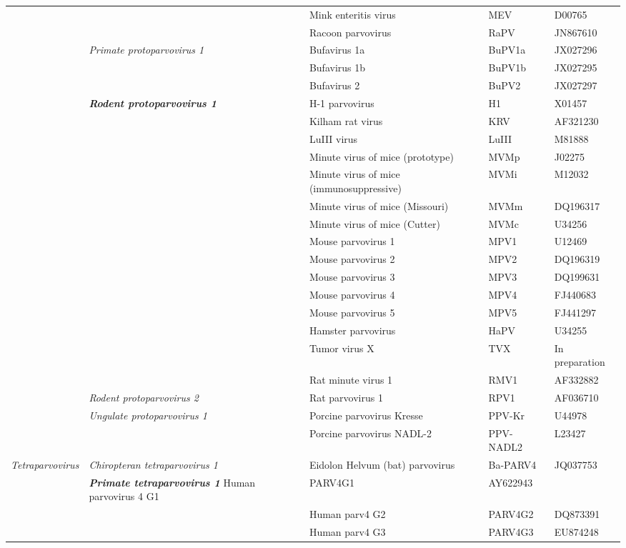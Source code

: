 \begin{longtable}{@{\extracolsep{\fill}}l l l l l}
 & & Mink enteritis virus & MEV & D00765 \\
 & & Racoon parvovirus & RaPV & JN867610 \\
 & \textit{Primate protoparvovirus 1} & Bufavirus 1a & BuPV1a & JX027296 \\
 & & Bufavirus 1b & BuPV1b & JX027295 \\
 & & Bufavirus 2 & BuPV2 & JX027297 \\
 & \textit{\textbf{Rodent protoparvovirus 1}} & H-1 parvovirus & H1 & X01457 \\
 & & Kilham rat virus & KRV & AF321230 \\
 & & LuIII virus & LuIII & M81888 \\
 & & Minute virus of mice (prototype) & MVMp & J02275 \\
 & & Minute virus of mice (immunosuppressive) & MVMi & M12032 \\
 & & Minute virus of mice (Missouri) & MVMm & DQ196317 \\
 & & Minute virus of mice (Cutter) & MVMc & U34256 \\
 & & Mouse parvovirus 1 & MPV1 & U12469 \\
 & & Mouse parvovirus 2 & MPV2 & DQ196319 \\
 & & Mouse parvovirus 3 & MPV3 & DQ199631 \\
 & & Mouse parvovirus 4 & MPV4 & FJ440683 \\
 & & Mouse parvovirus 5 & MPV5 & FJ441297 \\
 & & Hamster parvovirus & HaPV & U34255 \\ 
 & & Tumor virus X & TVX & In preparation \\
 & & Rat minute virus 1 & RMV1 & AF332882 \\
 & \textit{Rodent protoparvovirus 2} & Rat parvovirus 1 & RPV1 & AF036710 \\
 & \textit{Ungulate protoparvovirus 1} & Porcine parvovirus Kresse & PPV-Kr & U44978 \\
 & & Porcine parvovirus NADL-2 & PPV-NADL2 & L23427 \\
 \textit{Tetraparvovirus} & \textit{Chiropteran tetraparvovirus 1} & Eidolon Helvum (bat) parvovirus & Ba-PARV4 & JQ037753 \\
 & \textit{\textbf{Primate tetraparvovirus 1}} Human parvovirus 4 G1 & PARV4G1 & AY622943 \\
 & & Human parv4 G2 & PARV4G2 & DQ873391 \\      
 & & Human parv4 G3 & PARV4G3 & EU874248 \\

\end{longtable}
